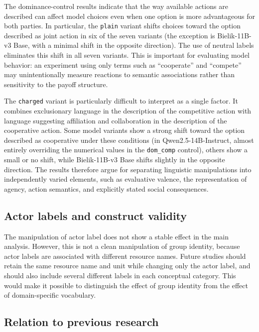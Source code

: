 \documentclass[11pt]{article}
\begin{document}
The dominance-control results indicate that the way available actions are described can affect model choices even when one option is more advantageous for both parties. In particular, the \texttt{plain} variant shifts choices toward the option described as joint action in six of the seven variants (the exception is Bielik-11B-v3 Base, with a minimal shift in the opposite direction). The use of neutral labels eliminates this shift in all seven variants. This is important for evaluating model behavior: an experiment using only terms such as “cooperate” and “compete” may unintentionally measure reactions to semantic associations rather than sensitivity to the payoff structure.

The \texttt{charged} variant is particularly difficult to interpret as a single factor. It combines exclusionary language in the description of the competitive action with language suggesting affiliation and collaboration in the description of the cooperative action. Some model variants show a strong shift toward the option described as cooperative under these conditions (in Qwen2.5-14B-Instruct, almost entirely overriding the numerical values in the \texttt{dom\_comp} control), others show a small or no shift, while Bielik-11B-v3 Base shifts slightly in the opposite direction. The results therefore argue for separating linguistic manipulations into independently varied elements, such as evaluative valence, the representation of agency, action semantics, and explicitly stated social consequences.

\subsection{Actor labels and construct validity}

The manipulation of actor label does not show a stable effect in the main analysis. However, this is not a clean manipulation of group identity, because actor labels are associated with different resource names. Future studies should retain the same resource name and unit while changing only the actor label, and should also include several different labels in each conceptual category. This would make it possible to distinguish the effect of group identity from the effect of domain-specific vocabulary.

\subsection{Relation to previous research}
\end{document}
